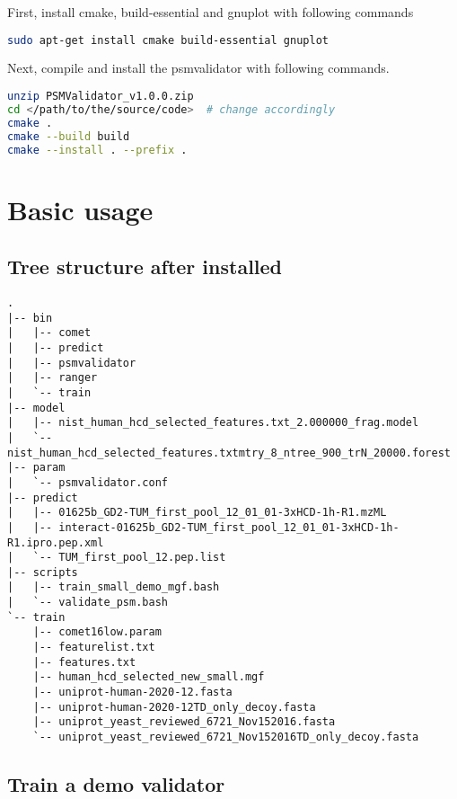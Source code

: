 \documentclass{ctexart}
\begin{document}
First, install cmake, build-essential and gnuplot with following commands

\begin{lstlisting}[language=bash]
sudo apt-get install cmake build-essential gnuplot
\end{lstlisting}

Next, compile and install the psmvalidator with following commands.

\begin{lstlisting}[language=bash,caption=compile and install from soruce code of PSMValidator]
unzip PSMValidator_v1.0.0.zip
cd </path/to/the/source/code>  # change accordingly
cmake .
cmake --build build
cmake --install . --prefix .
\end{lstlisting}


\section{ Basic usage}

\subsection{Tree structure after installed}

\begin{lstlisting}
.
|-- bin
|   |-- comet
|   |-- predict
|   |-- psmvalidator
|   |-- ranger
|   `-- train
|-- model
|   |-- nist_human_hcd_selected_features.txt_2.000000_frag.model
|   `-- nist_human_hcd_selected_features.txtmtry_8_ntree_900_trN_20000.forest
|-- param
|   `-- psmvalidator.conf
|-- predict
|   |-- 01625b_GD2-TUM_first_pool_12_01_01-3xHCD-1h-R1.mzML
|   |-- interact-01625b_GD2-TUM_first_pool_12_01_01-3xHCD-1h-R1.ipro.pep.xml
|   `-- TUM_first_pool_12.pep.list
|-- scripts
|   |-- train_small_demo_mgf.bash
|   `-- validate_psm.bash
`-- train
    |-- comet16low.param
    |-- featurelist.txt
    |-- features.txt
    |-- human_hcd_selected_new_small.mgf
    |-- uniprot-human-2020-12.fasta
    |-- uniprot-human-2020-12TD_only_decoy.fasta
    |-- uniprot_yeast_reviewed_6721_Nov152016.fasta
    `-- uniprot_yeast_reviewed_6721_Nov152016TD_only_decoy.fasta
\end{lstlisting}
                                      
\subsection{Train a demo validator}
\end{document}
